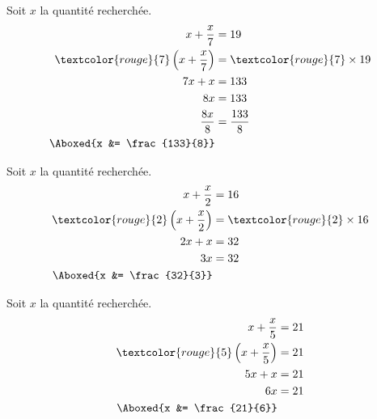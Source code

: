 \documentclass["../Cours.tex"]{subfiles}
\begin{document}
\begin{questions}
    \newcommand{\red}[1]{\textcolor{rouge}{#1}}
    \begin{minipage}[t]{0.5\linewidth}
        \exercice Soit $x$ la quantité recherchée.
        \begin{align*}
            x+\frac{x}{7} &= 19 \\
            \red{7} \left( x + \frac{x}{7} \right) &= \red{7} \times 19 \\
            7x + x &= 133 \\
            8x &= 133 \\
            \frac{8x}{8} &= \frac{133}{8} \\
            \Aboxed{x &= \frac{133}{8}}
        \end{align*}
    \end{minipage}
    \begin{minipage}[t]{0.45\linewidth}
        \exercice Soit $x$ la quantité recherchée.
        \begin{align*}
            x + \frac{x}{2} &= 16 \\
            \red{2} \left( x + \frac{x}{2} \right) &= \red{2} \times 16 \\
            2x + x &= 32 \\
            3x &= 32 \\
            \Aboxed{x &= \frac{32}{3}}
        \end{align*}
    \end{minipage}

    \exercice Soit $x$ la quantité recherchée.
    \begin{align*}
        x + \frac{x}{5} &= 21 \\
        \red{5} \left( x + \frac{x}{5} \right) &= 21 \\
        5x + x &= 21 \\ 
        6x &= 21 \\ 
        \Aboxed{x &= \frac{21}{6}}
    \end{align*}


\end{questions}
\end{document}
